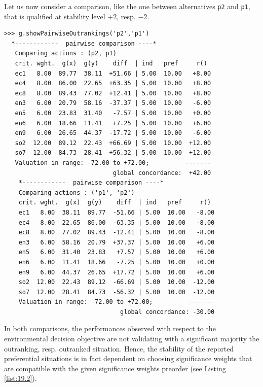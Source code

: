Let us now consider a comparison, like the one between alternatives \texttt{p2} and \texttt{p1}, that is qualified at stability level $+2$, resp. $-2$.
\begin{lstlisting}[caption={Comparison of alternatives \texttt{p2} and \texttt{p1}},label=list:19.5]
>>> g.showPairwiseOutrankings('p2','p1')
  *------------  pairwise comparison ----*
   Comparing actions : (p2, p1)
   crit. wght.  g(x)  g(y)    diff  | ind   pref     r()
   ec1   8.00  89.77  38.11  +51.66 | 5.00  10.00   +8.00
   ec4   8.00  86.00  22.65  +63.35 | 5.00  10.00   +8.00
   ec8   8.00  89.43  77.02  +12.41 | 5.00  10.00   +8.00
   en3   6.00  20.79  58.16  -37.37 | 5.00  10.00   -6.00
   en5   6.00  23.83  31.40   -7.57 | 5.00  10.00   +0.00
   en6   6.00  18.66  11.41   +7.25 | 5.00  10.00   +6.00
   en9   6.00  26.65  44.37  -17.72 | 5.00  10.00   -6.00
   so2  12.00  89.12  22.43  +66.69 | 5.00  10.00  +12.00
   so7  12.00  84.73  28.41  +56.32 | 5.00  10.00  +12.00
   Valuation in range: -72.00 to +72.00;          -------
                              global concordance:  +42.00
    *------------  pairwise comparison ----*
    Comparing actions : ('p1', 'p2')
    crit. wght.  g(x)  g(y)    diff  | ind   pref     r()
    ec1   8.00  38.11  89.77  -51.66 | 5.00  10.00   -8.00
    ec4   8.00  22.65  86.00  -63.35 | 5.00  10.00   -8.00
    ec8   8.00  77.02  89.43  -12.41 | 5.00  10.00   -8.00
    en3   6.00  58.16  20.79  +37.37 | 5.00  10.00   +6.00
    en5   6.00  31.40  23.83   +7.57 | 5.00  10.00   +6.00 
    en6   6.00  11.41  18.66   -7.25 | 5.00  10.00   +0.00
    en9   6.00  44.37  26.65  +17.72 | 5.00  10.00   +6.00
    so2  12.00  22.43  89.12  -66.69 | 5.00  10.00  -12.00
    so7  12.00  28.41  84.73  -56.32 | 5.00  10.00  -12.00
    Valuation in range: -72.00 to +72.00;          -------
                                global concordance: -30.00
\end{lstlisting}
In both comparisons, the performances observed with respect to the environmental decision objective are not validating with a significant majority the outranking, resp. outranked situation. Hence, the stability of the reported preferential situations is in fact dependent on choosing significance weights that are compatible with the given significance weights preorder (see Listing \ref{list:19.2}).

